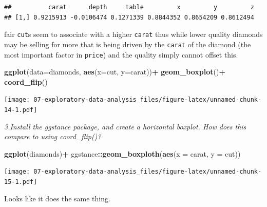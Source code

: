 \documentclass[]{book}
\newenvironment{Shaded}{\begin{snugshade}}{\end{snugshade}}
\newcommand{\DataTypeTok}[1]{\textcolor[rgb]{0.13,0.29,0.53}{#1}}
\newcommand{\KeywordTok}[1]{\textcolor[rgb]{0.13,0.29,0.53}{\textbf{#1}}}
\newcommand{\NormalTok}[1]{#1}
\newcommand{\OperatorTok}[1]{\textcolor[rgb]{0.81,0.36,0.00}{\textbf{#1}}}
\newcommand{\StringTok}[1]{\textcolor[rgb]{0.31,0.60,0.02}{#1}}
\theoremstyle{definition}
\theoremstyle{definition}
\theoremstyle{definition}
\theoremstyle{remark}
\begin{document}
\begin{Shaded}
\end{Shaded}

\begin{verbatim}
##          carat      depth     table         x         y         z
## [1,] 0.9215913 -0.0106474 0.1271339 0.8844352 0.8654209 0.8612494
\end{verbatim}

fair \texttt{cut}s seem to associate with a higher \texttt{carat} thus
while lower quality diamonds may be selling for more that is being
driven by the \texttt{carat} of the diamond (the most important factor
in \texttt{price}) and the quality simply cannot offset this.

\begin{Shaded}
\begin{Highlighting}[]
\KeywordTok{ggplot}\NormalTok{(}\DataTypeTok{data=}\NormalTok{diamonds, }\KeywordTok{aes}\NormalTok{(}\DataTypeTok{x=}\NormalTok{cut, }\DataTypeTok{y=}\NormalTok{carat))}\OperatorTok{+}
\StringTok{  }\KeywordTok{geom_boxplot}\NormalTok{()}\OperatorTok{+}
\StringTok{  }\KeywordTok{coord_flip}\NormalTok{()}
\end{Highlighting}
\end{Shaded}

\texttt{[image: 07-exploratory-data-analysis\_files/figure-latex/unnamed-chunk-14-1.pdf]}

\emph{3.Install the ggstance package, and create a horizontal boxplot.
How does this compare to using coord\_flip()?}

\begin{Shaded}
\begin{Highlighting}[]
\KeywordTok{ggplot}\NormalTok{(diamonds)}\OperatorTok{+}
\StringTok{  }\NormalTok{ggstance}\OperatorTok{::}\KeywordTok{geom_boxploth}\NormalTok{(}\KeywordTok{aes}\NormalTok{(}\DataTypeTok{x =}\NormalTok{ carat, }\DataTypeTok{y =}\NormalTok{ cut))}
\end{Highlighting}
\end{Shaded}

\texttt{[image: 07-exploratory-data-analysis\_files/figure-latex/unnamed-chunk-15-1.pdf]}

Looks like it does the same thing.
\end{document}

